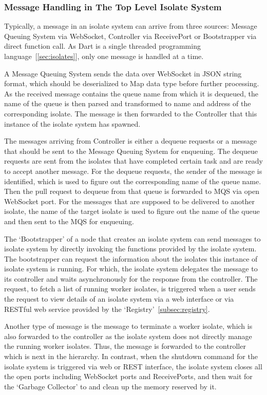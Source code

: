  \subsubsection{Message Handling in The Top Level Isolate System}
  Typically, a message in an isolate system can arrive from three sources: Message Queuing System via WebSocket, Controller via ReceivePort or Bootstrapper via direct function call. As Dart is a single threaded programming language~[\autoref{sec:isolates}], only one message is handled at a time.

  A Message Queuing System sends the data over WebSocket in JSON string format, which should be deserialized to Map data type before further processing. As the received message contains the queue name from which it is dequeued, the name of the queue is then parsed and transformed to name and address of the corresponding isolate. The message is then forwarded to the Controller that this instance of the isolate system has spawned.

  The messages arriving from Controller is either a dequeue requests or a message that should be sent to the Message Queuing System for enqueuing. The dequeue requests are sent from the isolates that have completed certain task and are ready to accept another message. For the dequeue requests, the sender of the message is identified, which is used to figure out the corresponding name of the queue name. Then the pull request to dequeue from that queue is forwarded to MQS via open WebSocket port. For the messages that are supposed to be delivered to another isolate, the name of the target isolate is used to figure out the name of the queue and then sent to the MQS for enqueuing.

  The ‘Bootstrapper’ of a node that creates an isolate system can send messages to isolate system by directly invoking the functions provided by the isolate system. The bootstrapper can request the information about the isolates this instance of isolate system is running. For which, the isolate system delegates the message to its controller and waits asynchronously for the response from the controller. The request, to fetch a list of running worker isolates, is triggered when a user sends the request to view details of an isolate system via a web interface or via RESTful web service provided by the ‘Registry’~\autoref{subsec:registry}.

  Another type of message is the message to terminate a worker isolate, which is also forwarded to the controller as the isolate system does not directly manage the running worker isolates. Thus, the message is forwarded to the controller which is next in the hierarchy. In contrast, when the shutdown command for the isolate system is triggered via web or REST interface, the isolate system closes all the open ports including WebSocket ports and ReceivePorts, and then wait for the ‘Garbage Collector’ to and clean up the memory reserved by it.

